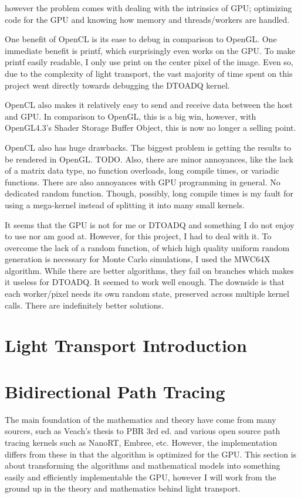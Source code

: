 \message{ !name(test.tex)}\documentclass{article}
\begin{document}
	however the problem comes with dealing with the intrinsics of GPU; optimizing
code for the GPU and knowing how memory and threads/workers are handled.
  
  	One benefit of OpenCL is its ease to debug in comparison to OpenGL. One
immediate benefit is printf, which surprisingly even works on the GPU. To make
printf easily readable, I only use print on the center pixel of the image. Even
so, due to the complexity of light transport, the vast majority of time spent on
this project went directly towards debugging the DTOADQ kernel.
  	
  	OpenCL also makes it relatively easy to send and receive data between the
host and GPU. In comparison to OpenGL, this is a big win, however, with
OpenGL4.3's Shader Storage Buffer Object, this is now no longer a selling point.
  	
  	OpenCL also has huge drawbacks. The biggest problem is getting the results
to be rendered in OpenGL. TODO. Also, there are minor annoyances, like the lack
of a matrix data type, no function overloads, long compile times, or variadic
functions. There are also annoyances with GPU programming in general. No
dedicated random function. Though, possibly, long compile times is my fault for
using a mega-kernel instead of splitting it into many small kernels.
  	
  	It seems that the GPU is not for me or DTOADQ and something I do not enjoy
to use nor am good at. However, for this project, I had to deal with it. To
overcome the lack of a random function, of which high quality uniform random
generation is necessary for Monte Carlo simulations, I used the MWC64X
algorithm. While there are better algorithms, they fail on branches which makes
it useless for DTOADQ. It seemed to work well enough. The downside is that each
worker/pixel needs its own random state, preserved across multiple kernel calls.
There are indefinitely better solutions.
  \section{Light Transport Introduction}
  \section{Bidirectional Path Tracing}
    The main foundation of the mathematics and theory have come from many
sources, such as Veach's thesis to PBR 3rd ed. and various open source path
tracing kernels such as NanoRT, Embree, etc. However, the implementation differs
from these in that the algorithm is optimized for the GPU. This section is about
transforming the algorithms and mathematical models into something easily and
efficiently implementable the GPU, however I will work from the ground up in the
theory and mathematics behind light transport.
\end{document}
